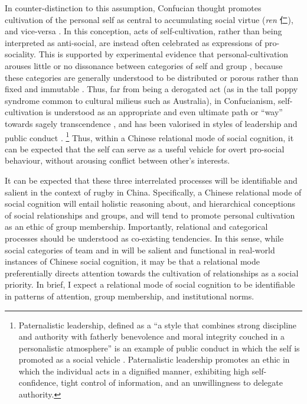 \begin{CJK}{UTF8}{gbsn}
In counter-distinction to this assumption, Confucian thought promotes cultivation of the personal self as central to accumulating social virtue (\textit{ren} 仁), and vice-versa \citep{Hwang2012}.
In this conception, acts of self-cultivation, rather than being interpreted as anti-social, are instead often celebrated as expressions of pro-sociality.  This is supported by experimental evidence that personal-cultivation arouses little or no dissonance between categories of self and group \citep{Suh2002}, because these categories are generally understood to be distributed or porous rather than fixed and immutable \citep{Nisbett2003}.  Thus, far from being a derogated act (as in the tall poppy syndrome common to cultural milieus such as Australia), in Confucianism, self-cultivation is understood as an appropriate and even ultimate path or ``way'' towards sagely transcendence \citep[106]{Hwang2012}, and has been valorised in styles of leadership and public conduct \citep{Farh2000,Cheng2004}.
  \footnote{Paternalistic leadership, defined as a ``a style that combines strong discipline and authority with fatherly benevolence and moral integrity couched in a personalistic atmosphere'' is an example of public conduct in which the self is promoted as a social vehicle \citep[91]{Cheng2004}.  Paternalistic leadership promotes an ethic in which the individual acts in a dignified manner, exhibiting high self-confidence, tight control of information, and an unwillingness to delegate authority.}
Thus, within a Chinese relational mode of social cognition, it can be expected that the self can serve as a useful vehicle for overt pro-social behaviour, without arousing conflict between other's interests.

It can be expected that these three interrelated processes will be identifiable and salient in the context of rugby in China.  Specifically, a Chinese relational mode of social cognition will entail holistic reasoning about, and hierarchical conceptions of social relationships and groups, and will tend to promote personal cultivation as an ethic of group membership.    Importantly, relational and categorical processes should be understood as co-existing tendencies.  In this sense, while social categories of team and in will be salient and functional in real-world instances of Chinese social cognition, it may be that a relational mode preferentially directs attention towards the cultivation of relationships as a social priority.  In brief, I expect a relational mode of social cognition to be identifiable in patterns of attention, group membership, and institutional norms.


\end{CJK}
